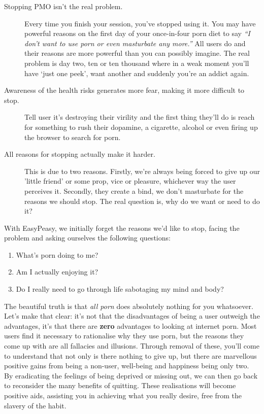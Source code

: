 \documentclass[easypeasy.tex]{subfiles}
\begin{document}
\begin{description}
  \item [Stopping PMO isn't the real problem.] Every time you finish your session, you've stopped using it. You may have powerful reasons on the first day of your once-in-four porn diet to say \textit{``I don't want to use porn or even masturbate any more.''} All users do and their reasons are more powerful than you can possibly imagine. The real problem is day two, ten or ten thousand where in a weak moment you'll have `just one peek', want another and suddenly you're an addict again.

  \item [Awareness of the health risks generates more fear, making it more difficult to stop.] Tell user it's destroying their virility and the first thing they'll do is reach for something to rush their dopamine, a cigarette, alcohol or even firing up the browser to search for porn.

  \item [All reasons for stopping actually make it harder.] This is due to two reasons. Firstly, we're always being forced to give up our 'little friend' or some prop, vice or pleasure, whichever way the user perceives it. Secondly, they create a bind, we don't masturbate for the reasons we should stop. The real question is, why do we want or need to do it?
\end{description}

With EasyPeasy, we initially forget the reasons we'd like to stop, facing the problem and asking ourselves the following questions:

\begin{enumerate}
\item What's porn doing to me?
\item Am I actually enjoying it?
\item Do I really need to go through life sabotaging my mind and body?
\end{enumerate}

The beautiful truth is that \textit{all porn} does absolutely nothing for you whatsoever. Let's make that clear: it's not that the disadvantages of being a user outweigh the advantages, it's that there are \textbf{zero} advantages to looking at internet porn. Most users find it necessary to rationalise why they use porn, but the reasons they come up with are all fallacies and illusions. Through removal of these, you'll come to understand that not only is there nothing to give up, but there are marvellous positive gains from being a non-user, well-being and happiness being only two. By eradicating the feelings of being deprived or missing out, we can then go back to reconsider the many benefits of quitting. These realisations will become positive aids, assisting you in achieving what you really desire, free from the slavery of the habit.
\end{document}
